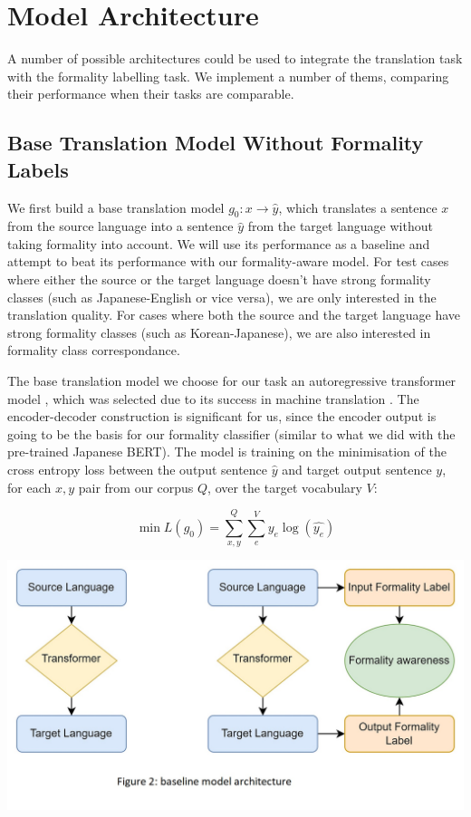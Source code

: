 \documentclass[11pt]{article}
\begin{document}
\section{Model Architecture}

A number of possible architectures could be used to integrate the translation task with the formality labelling task. We implement a number of thems, comparing their performance when their tasks are comparable.

\subsection{Base Translation Model Without Formality Labels}

We first build a base translation model $g_0: x \rightarrow \hat{y}$, which translates a sentence $x$ from the source language into a sentence $\hat{y}$ from the target language without taking formality into account. We will use its performance as a baseline and attempt to beat its performance with our formality-aware model. For test cases where either the source or the target language doesn't have strong formality classes (such as Japanese-English or vice versa), we are only interested in the translation quality. For cases where both the source and the target language have strong formality classes (such as Korean-Japanese), we are also interested in formality class correspondance.

The base translation model we choose for our task an autoregressive transformer model \cite{vaswani2017attention}, which was selected due to its success in machine translation \cite{liu2020deep}. The encoder-decoder construction is significant for us, since the encoder output is going to be the basis for our formality classifier (similar to what we did with the pre-trained Japanese BERT). The model is training on the minimisation of the cross entropy loss between the output sentence $\hat{y}$ and target output sentence $y$, for each $x, y$ pair from our corpus $Q$, over the target vocabulary $V$:

\begin{equation}
    \min{L(g_0)} = \sum_{x, y}^Q{\sum_{e}^{V}{y_e \log{(\hat{y_e})}}}
\end{equation}

\includegraphics{images/baseline.jpg}
\end{document}
